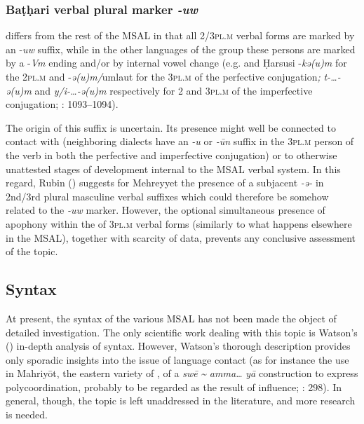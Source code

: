 \documentclass[output=paper]{langsci/langscibook}
\begin{document}
 \subsubsection{Baṭḥari verbal plural marker \textit{{}-uw}} 

 differs from the rest of the MSAL in that all 2/\textsc{3pl.m} verbal forms are marked by an -\textit{uw} suffix, while in the other languages of the group these persons are marked by a -\textit{Vm} ending and/or by internal vowel change (e.g.  and Ḥarsusi -\textit{kə(u)m} for the \textsc{2pl.m} and -\textit{ə(u)m/}umlaut for the \textsc{3pl.m} of the perfective conjugation\textit{;} \textit{t-…-ə(u)m} and \textit{y/i-…-ə(u)m} respectively for 2 and \textsc{3pl.m} of the imperfective conjugation; \citealt{Simeone-Senelle2011}: 1093--1094). 

The origin of this suffix is uncertain. Its presence might well be connected to contact with  (neighboring dialects have an \textit{{}-u} or \textit{{}-}\textit{ūn} suffix in the \textsc{3pl.m} person of the verb in both the perfective and imperfective conjugation) or to otherwise unattested stages of development internal to the MSAL verbal system. In this regard, Rubin (\citeyear[5]{Rubin2017}) suggests for {Mehreyyet} the presence of a subjacent \textit{{}-ə{}-} in 2nd/3rd plural masculine verbal suffixes which could therefore be somehow related to the  \textit{{}-uw} marker. However, the optional simultaneous presence of apophony within the  of \textsc{3pl.m} verbal forms (similarly to what happens elsewhere in the MSAL), together with scarcity of data, prevents any conclusive assessment of the topic.


 
 \subsection{Syntax}\label{sec:key:syn}


At present, the syntax of the various MSAL has not been made the object of detailed investigation. The only scientific work dealing with this topic is Watson's (\citeyear{Watson2012}) in-depth analysis of  syntax. However, Watson’s thorough description provides only sporadic insights into the issue of language contact (as for instance the use in Mahriyōt, the {eastern}  variety of , of a \textit{swē} \textit{{\textasciitilde}} \textit{amma…} \textit{yā} construction to express polycoordination, probably to be regarded as the result of  influence; \citealt{Watson2012}: 298). In general, though, the topic is left unaddressed in the literature, and more research is needed.
\end{document}
